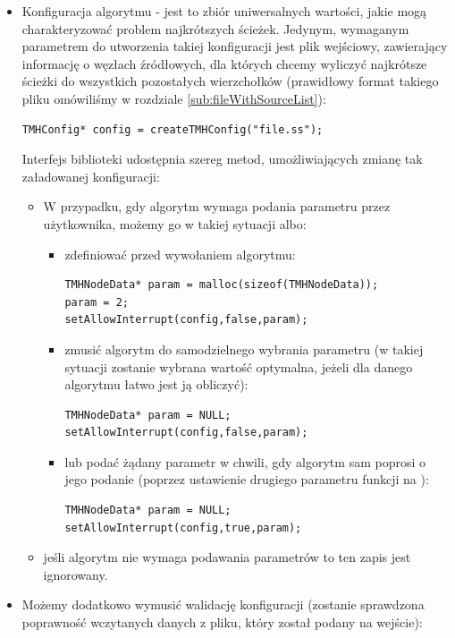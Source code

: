 \begin{itemize}
	\item Konfiguracja algorytmu - jest to zbiór uniwersalnych wartości, jakie mogą charakteryzować problem najkrótszych ścieżek. Jedynym, wymaganym parametrem do utworzenia takiej konfiguracji jest plik wejściowy, zawierający informację o węzłach źródłowych, dla których chcemy wyliczyć najkrótsze ścieżki do wszystkich pozostałych wierzchołków (prawidłowy format takiego pliku omówiliśmy w rozdziale \ref{sub:fileWithSourceList}):
	\begin{lstlisting}[style=customc]
TMHConfig* config = createTMHConfig("file.ss");
	\end{lstlisting}
	Interfejs biblioteki udostępnia szereg metod, umożliwiających zmianę tak załadowanej konfiguracji:
	\begin{itemize}
		\item W przypadku, gdy algorytm wymaga podania parametru przez użytkownika, możemy go w takiej sytuacji albo:
		\begin{itemize}
			\item zdefiniować przed wywołaniem algorytmu:
			\begin{lstlisting}[style=customc]
TMHNodeData* param = malloc(sizeof(TMHNodeData));
param = 2;
setAllowInterrupt(config,false,param);
			\end{lstlisting}
			\item zmusić algorytm do samodzielnego wybrania parametru (w takiej sytuacji zostanie wybrana wartość optymalna, jeżeli dla danego algorytmu łatwo jest ją obliczyć):
			\begin{lstlisting}[style=customc]
TMHNodeData* param = NULL;
setAllowInterrupt(config,false,param);
			\end{lstlisting}
			\item lub podać żądany parametr w chwili, gdy algorytm sam poprosi o jego podanie (poprzez ustawienie drugiego parametru funkcji na \KwTrue):
			\begin{lstlisting}[style=customc]
TMHNodeData* param = NULL;
setAllowInterrupt(config,true,param);
			\end{lstlisting}
		\end{itemize}
	\item jeśli algorytm nie wymaga podawania parametrów to ten zapis jest ignorowany. 
	\end{itemize}
	\item Możemy dodatkowo wymusić walidację konfiguracji (zostanie sprawdzona poprawność wczytanych danych z pliku, który został podany na wejście):

\end{itemize}
